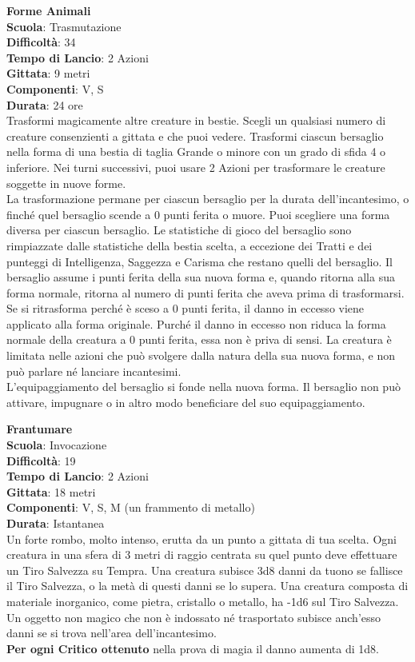 \begin{multicols}{2}
\medskip\textbf{Forme Animali}\\
\textbf{Scuola}: Trasmutazione\\
\textbf{Difficoltà}: 34\\
\textbf{Tempo di Lancio}: 2 Azioni\\
\textbf{Gittata}: 9 metri\\
\textbf{Componenti}: V, S\\
\textbf{Durata}: 24 ore\\
Trasformi magicamente altre creature in bestie. Scegli un qualsiasi numero di creature consenzienti a gittata e che puoi vedere. Trasformi ciascun bersaglio nella forma di una bestia di taglia Grande o minore con un grado di sfida 4 o inferiore. Nei turni successivi, puoi usare 2 Azioni per trasformare le creature soggette in nuove forme.\\
La trasformazione permane per ciascun bersaglio per la durata dell'incantesimo, o finché quel bersaglio scende a 0 punti ferita o muore. Puoi scegliere una forma diversa per ciascun bersaglio. Le statistiche di gioco del bersaglio sono rimpiazzate dalle statistiche della bestia scelta, a eccezione dei Tratti e dei punteggi di Intelligenza, Saggezza e Carisma che restano quelli del
bersaglio. Il bersaglio assume i punti ferita della sua nuova forma e, quando ritorna alla sua forma normale, ritorna al numero di punti ferita che aveva prima di trasformarsi. Se si ritrasforma perché è sceso a 0 punti ferita, il danno in eccesso viene applicato alla forma originale. Purché il danno in eccesso non riduca la forma normale della creatura a 0 punti ferita, essa non è priva di sensi. La creatura è limitata nelle azioni che può svolgere dalla natura della sua nuova forma, e non può parlare né lanciare incantesimi.\\
L'equipaggiamento del bersaglio si fonde nella nuova forma. Il bersaglio non può attivare, impugnare o in altro modo beneficiare del suo equipaggiamento.

\medskip\textbf{Frantumare}\\
\textbf{Scuola}: Invocazione\\
\textbf{Difficoltà}: 19\\
\textbf{Tempo di Lancio}: 2 Azioni\\
\textbf{Gittata}: 18 metri\\
\textbf{Componenti}: V, S, M (un frammento di metallo)\\
\textbf{Durata}: Istantanea\\
Un forte rombo, molto intenso, erutta da un punto a gittata di tua scelta. Ogni creatura in una sfera di 3 metri di raggio centrata su quel punto deve effettuare un Tiro Salvezza su Tempra. Una creatura subisce 3d8 danni da tuono se fallisce il Tiro Salvezza, o la metà di questi danni se lo supera. Una creatura composta di materiale inorganico, come pietra, cristallo o metallo, ha -1d6 sul Tiro Salvezza. Un oggetto non magico che non è indossato né trasportato subisce anch'esso danni se si trova nell'area dell'incantesimo.\\
\textbf{Per ogni Critico ottenuto} nella prova di magia il danno aumenta di 1d8.


\end{multicols}
